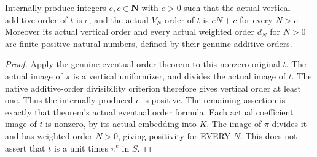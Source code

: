 \begin{lemma}
\label{lem:gauss-surface-parameter-positive-vertical-order}
\leanok
\leavevmode\par
Internally produce integers $e,c\in\mathbf N$ with $e>0$ such that the
actual vertical additive order of $t$ is $e$, and the actual $V_N$-order
of $t$ is $eN+c$ for every $N>c$. Moreover its actual vertical
order and every actual weighted order $d_N$ for $N>0$ are finite positive
natural numbers, defined by their genuine additive orders.
\end{lemma}
\begin{proof}
Apply the genuine eventual-order theorem to this nonzero original $t$.
The actual image of $\pi$ is a vertical uniformizer, and divides the
actual image of $t$. The native additive-order divisibility criterion
therefore gives vertical order at least one. Thus the internally
produced $e$ is positive. The remaining assertion is exactly that
theorem's actual eventual order formula. Each actual coefficient image
of $t$ is nonzero, by its actual embedding into $K$. The image of $\pi$
divides it and has weighted order $N>0$, giving positivity for EVERY $N$.
This does not assert that
$t$ is a unit times $\pi^e$ in $S$.
\end{proof}

